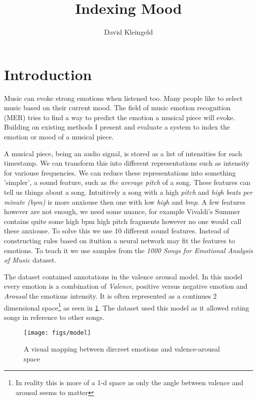 \documentclass[lang=en, hanging-titles=true]{skrapport}
\title{Indexing Mood}
\author[dskleingeld@gmail.com]{David Kleingeld}
\begin{document}
\maketitle
\tableofcontents

\section{Introduction}
Music can evoke strong emotions when listened too. Many people like to select music based on their current mood. The field of music emotion recognition (MER) tries to find a way to predict the emotion a musical piece will evoke. Building on existing methods I present and evaluate a system to index the emotion or mood of a musical piece.

A musical piece, being an audio signal, is stored as a list of intensities for each timestamp. We can transform this into different representations such as intensity for variouse frequencies. We can reduce these representations into something 'simpler', a sound feature, such as \textit{the average pitch} of a song. These features can tell us things about a song. Intuitively a song with a high \textit{pitch} and \textit{high beats per minute (bpm)} is more anxiouse then one with low \textit{high} and \textit{bmp}. A few features however are not enough, we need some nuance, for example Vivaldi's Summer contains quite some high bpm high pitch fragments however no one would call these anxiouse. To solve this we use 10 different sound features. Instead of constructing rules based on ituition a neural network may fit the features to emotions. To teach it we use samples from the \textit{1000 Songs for Emotional Analysis of Music}\cite{dataset} dataset.

The dataset contained annotations in the valence arousal model. In this model every emotion is a combination of \textit{Valence}, positive versus negative emotion and \textit{Arousal} the emotions intensity. It is often represented as a continues 2 dimensional space\footnote{In reality this is more of a 1-d space as only the angle between valence and arousal seems to matter} as seen in \cref{fig:model}. The dataset used this model as it allowed rating songs in reference to other songs.

\begin{figure}[htbp]
	\centering
	\texttt{[image: figs/model]}
	\caption{A visual mapping between dircreet emotions and valence-arousal space}
	\label{fig:model}
\end{figure}
\end{document}
